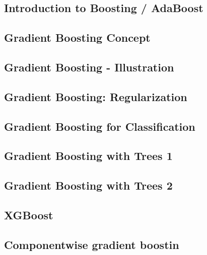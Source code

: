 




\subsection{Introduction to Boosting / AdaBoost}


\subsection{Gradient Boosting Concept}


\subsection{Gradient Boosting - Illustration}


\subsection{Gradient Boosting: Regularization}


\subsection{Gradient Boosting for Classification}


\subsection{Gradient Boosting with Trees 1}


\subsection{Gradient Boosting with Trees 2}


\subsection{XGBoost}


\subsection{Componentwise gradient boostin}









